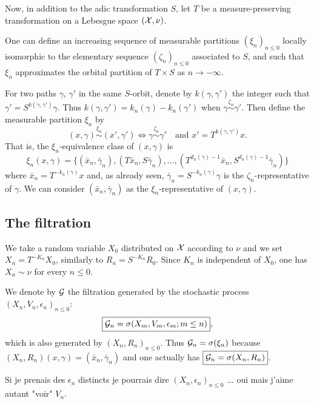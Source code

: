 \documentclass[12pt,a4paper]{article}
\begin{document}
Now, in addition to the adic transformation $S$, let $T$ be a measure-preserving transformation on a Lebesgue space $(\mathcal{X}, \nu)$. 

One can define an increasing sequence of measurable partitions ${(\xi_n)}_{n \leq 0}$ 
locally isomorphic to the elementary sequence ${(\zeta_n)}_{n \leq 0}$ associated to $S$,  
and such that $\xi_n$ approximates the orbital partition of $T \times S$ as 
$n \to -\infty$.

For two paths $\gamma$, $\gamma'$ in the same $S$-orbit, denote by $k(\gamma,\gamma')$ 
the integer such that $\gamma'=S^{k(\gamma,\gamma')}\gamma$. 
Thus $k(\gamma,\gamma') = k_n(\gamma)-k_n(\gamma')$ when $\gamma \overset{\zeta_n}{\sim} \gamma'$. 
Then define the measurable partition $\xi_n$ by 
$$
\boxed{(x, \gamma) \overset{\xi_n}{\sim} (x', \gamma') \iff 
\gamma \overset{\zeta_n}{\sim} \gamma' \quad 
\text{and $x'=T^{k(\gamma,\gamma')}x$}}. 
$$
That is, the $\xi_n$-equivalence class of $(x,\gamma)$ is 
$$
\boxed{\xi_n(x,\gamma) = \bigl\{(\bar x_n, \bar\gamma_n), (T\bar x_n, S\bar\gamma_n), 
\ldots, (T^{d_n(\gamma)-1}\bar x_n, S^{d_n(\gamma)-1}\bar\gamma_n) \bigr\}}
$$
where $\bar x_n = T^{-k_n(\gamma)}x$ and, as already seen, 
$\bar\gamma_n = S^{-k_n(\gamma)}\gamma$ is the $\zeta_n$-representative of 
$\gamma$. 
We can consider $(\bar x_n, \bar\gamma_n)$ as the $\xi_n$-representative of
$(x,\gamma)$. 


\subsection{The filtration} 

We take a random variable $X_0$ distributed on $\mathcal{X}$ according to $\nu$ 
and we set $\boxed{X_n = T^{-K_n} X_0}$, similarly to $R_n = S^{-K_n} R_0$. 
Since $K_n$ is independent of $X_0$, one has $X_n \sim \nu$ for every $n \leq 0$.

We denote by $\mathcal{G}$ the filtration generated by the stochastic process 
${(X_n, V_n, \epsilon_n)}_{n \leq 0}$:
$$
\boxed{\mathcal{G}_n = \sigma(X_m, V_m, \epsilon_m; m \leq n)}, 
$$
 which is also generated by ${(X_n, R_n)}_{n \leq 0}$. 
 Thus $\mathcal{G}_n = \sigma(\xi_n)$ because $(X_n,R_n)(x,\gamma) = (\bar x_n, \bar\gamma_n)$ 
and one actually has 
$\boxed{\mathcal{G}_n = \sigma(X_n, R_n)}$.

\begin{remark}
Si je prenais des $\epsilon_n$ distincts je pourrais dire 
${(X_n, \epsilon_n)}_{n \leq 0}$ ... oui mais j'aime autant "voir" $V_n$.
\end{remark}
\end{document}
